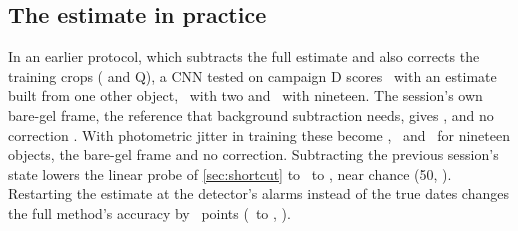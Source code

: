 \subsection{The estimate in practice}
\label{sec:practice}
\label{sec:trackerexp}

In an earlier protocol, which subtracts the full estimate and also corrects the training crops ( and Q), a CNN tested on campaign D scores \CvsSupObjOne\pct\ with an estimate built from one other object, \CvsSupObjTwo\pct\ with two and \CvsSupObjNineteen\pct\ with nineteen. The session's own bare-gel frame, the reference that background subtraction needs, gives \SrcSupBlankAcc\pct, and no correction \SrcSupNoneAcc\pct. With photometric jitter in training these become \CvsAugObjNineteen, \SrcAugBlankAcc\ and \SrcAugNoneAcc\pct\ for nineteen objects, the bare-gel frame and no correction. Subtracting the previous session's state lowers the linear probe of \cref{sec:shortcut} to \ProbeIjepaPrevUnit\ to \ProbeDinovPrevUnit\pct, near chance (50\pct, ). Restarting the estimate at the detector's alarms instead of the true dates changes the full method's accuracy by \XdFullVarDetVsLp\ points (\XdFullVarDetVsLpLo\ to \XdFullVarDetVsLpHi, ).
